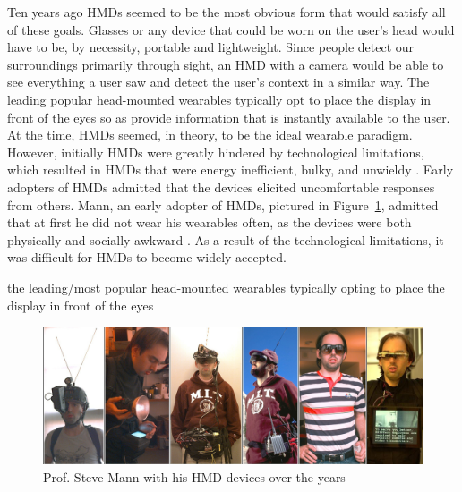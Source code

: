 \documentclass[11pt]{article}
\begin{document}
Ten years ago HMDs seemed to be the most obvious form that would satisfy all of these goals. Glasses or any device that could be worn on the user's head would have to be, by necessity, portable and lightweight. Since people detect our surroundings primarily through sight, an HMD with a camera would be able to see everything a user saw and detect the user's context in a similar way. The leading popular head-mounted wearables typically opt to place the display in front of the eyes so as provide information that is instantly available to the user. At the time, HMDs seemed, in theory, to be the ideal wearable paradigm. However, initially HMDs were greatly hindered by technological limitations, which resulted in HMDs that were energy inefficient, bulky, and unwieldy \cite{fromCyborgsToGG}. Early adopters of HMDs admitted that the devices elicited uncomfortable responses from others. Mann, an early adopter of HMDs, pictured in Figure~\ref{fig:Mann}, admitted that at first he did not wear his wearables often, as the devices were both physically and socially awkward \cite{smartClothingShift}.  As a result of the technological limitations, it was difficult for HMDs to become widely accepted.  

the leading/most popular head-mounted wearables typically opting to place the display in front of the eyes

\begin{figure}[H] %
   \centering
   \includegraphics[width=5in]{Wearcompevolution2.jpg}       
   \caption{Prof. Steve Mann with his HMD devices over the years \cite{wearablesOverTime}}
   \label{fig:Mann}
\end{figure} 
\end{document}
